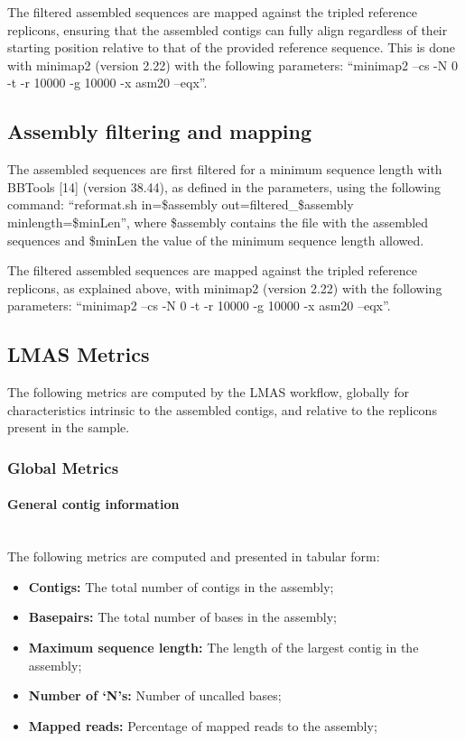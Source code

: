 The filtered assembled sequences are mapped against the tripled reference replicons, ensuring that the assembled contigs can fully align regardless of their starting position relative to that of the provided reference sequence. This is done with minimap2 \cite{li_minimap2_2018} (version 2.22) with the following parameters: “minimap2 --cs -N 0 -t -r 10000 -g 10000 -x asm20 --eqx”.

\subsection{Assembly filtering and mapping} \label{ch5_sup_assembly_filtering_and_mapping}

The assembled sequences are first filtered for a minimum sequence length with BBTools [14] (version 38.44), as defined in the parameters, using the following command: “reformat.sh in=\$assembly out=filtered\_\$assembly minlength=\$minLen”, where \$assembly contains the file with the assembled sequences and \$minLen the value of the minimum sequence length allowed. 

The filtered assembled sequences are mapped against the tripled reference replicons, as explained above, with minimap2 \cite{li_minimap2_2018} (version 2.22) with the following parameters: “minimap2 --cs -N 0 -t -r 10000 -g 10000 -x asm20 --eqx”.

\subsection{LMAS Metrics} \label{ch5_supmaterial_metrics}

The following metrics are computed by the LMAS workflow, globally for characteristics intrinsic to the assembled contigs, and relative to the replicons present in the sample. 

\subsubsection{Global Metrics} \label{ch5_supmaterial_metrics_global}

\paragraph{General contig information} \mbox{}\\

The following metrics are computed and presented in tabular form: 

\begin{itemize}
    \item \textbf{Contigs:} The total number of contigs in the assembly;
    \item \textbf{Basepairs:} The total number of bases in the assembly;
    \item \textbf{Maximum sequence length:} The length of the largest contig in the assembly;
    \item \textbf{Number of ‘N’s:} Number of uncalled bases;
    \item \textbf{Mapped reads:} Percentage of mapped reads to the assembly;
\end{itemize}

